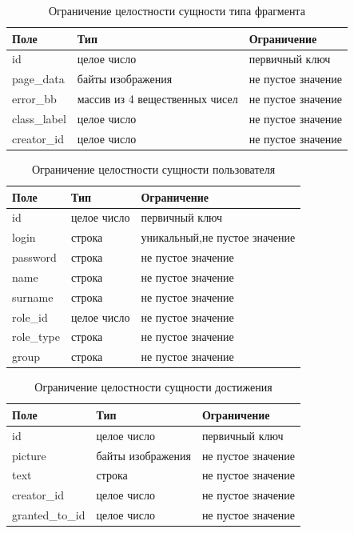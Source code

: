 \begin{table}[H]
	 \centering
	 \caption{Ограничение целостности сущности типа фрагмента}
	\begin{tabularx}{\textwidth}{|X|X|X|}
		\hline
		Поле & Тип & Ограничение \\
		\hline
		id & целое число & первичный ключ \\
		\hline
		page\_data & байты изображения & не пустое значение\\
		\hline
		error\_bb & массив из 4 вещественных чисел & не пустое значение\\
		\hline
		class\_label & целое число & не пустое значение\\
		\hline
		creator\_id & целое число & не пустое значение\\
		\hline
	\end{tabularx}
	\label{t:markups}
\end{table}




\begin{table}[h!tbp]
	\centering
	\caption{Ограничение целостности сущности пользователя}
	\begin{tabularx}{\textwidth}{|X|X|X|}
	\hline
	Поле & Тип & Ограничение \\
	\hline
	id & целое число & первичный ключ\\
	\hline
	login & строка & уникальный,не пустое значение\\
	\hline
	password & строка & не пустое значение\\
	\hline
	name & строка & не пустое значение\\
	\hline
	surname & строка & не пустое значение\\
	\hline
	role\_id & целое число & не пустое значение\\
	\hline
	role\_type & строка & не пустое значение\\
	\hline
	group & строка & не пустое значение\\
	\hline
	\end{tabularx}
	\label{t:users_cons}
\end{table}


\begin{table}[h!tbp]
	\centering
	\caption{Ограничение целостности сущности достижения}
	\begin{tabularx}{\textwidth}{|X|X|X|}
		\hline
		Поле & Тип & Ограничение \\
		\hline
		id & целое число & первичный ключ\\
		\hline
		picture & байты изображения &  не пустое значение\\
		\hline
		text & строка & не пустое значение\\
		\hline
		creator\_id & целое число & не пустое значение\\
		\hline
		granted\_to\_id & целое число & не пустое значение \\
		\hline
	\end{tabularx}
	\label{t:achievment_cons}
\end{table}

